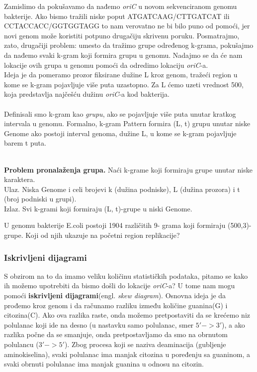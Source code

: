 Zamislimo da pokušavamo da nađemo \textit{oriC} u novom sekvenciranom genomu bakterije. Ako bismo tražili niske poput ATGATCAAG/CTTGATCAT ili CCTACCACC/GGTGGTAGG to nam verovatno ne bi bilo puno od pomoći, jer novi genom može koristiti potpuno drugačiju skrivenu poruku. Posmatrajmo, zato, drugačiji problem: umesto da tražimo grupe određenog k-grama, pokušajmo da nađemo svaki k-gram koji formira grupu u genomu. Nadajmo se da će nam lokacije ovih grupa u genomu pomoći da odredimo lokaciju \textit{oriC}-a.\\Ideja je da pomeramo prozor fiksirane dužine L kroz genom, tražeći region u kome se k-gram pojavljuje više puta uzastopno. Za L ćemo uzeti vrednost 500, koja predstavlja najčešću dužinu \textit{oriC}-a kod bakterija. \\\\
Definisali smo k-gram kao \textit{grupu}, ako se pojavljuje više puta unutar kratkog intervala u genomu. Formalno, k-gram Pattern formira (L, t) grupu unutar niske Genome ako postoji interval genoma, dužine L, u kome se k-gram pojavljuje barem t puta. \\\\
\begin{tcolorbox}
\textbf{Problem pronalaženja grupa.} Naći k-grame koji
formiraju grupe unutar niske karaktera.\\
Ulaz. Niska Genome i celi brojevi k (dužina
podniske), L (dužina prozora) i t (broj podniski u
grupi).\\
Izlaz. Svi k-grami koji formiraju (L, t)-grupe u
niski Genome.
\end{tcolorbox}

U genomu bakterije E.coli postoji 1904 različitih 9-
grama koji formiraju (500,3)-grupe. Koji od njih
ukazuje na početni region replikacije?

\subsubsection{Iskrivljeni dijagrami}

S obzirom na to da imamo veliku količinu statističkih podataka, pitamo se kako ih možemo upotrebiti da bismo došli do lokacije \textit{oriC}-a? U tome nam mogu pomoći \textbf{iskrivljeni dijagrami}(engl. \textit{skew diagram}). Osnovna ideja je da prođemo kroz genom i da računamo razliku između količine guanina(G) i citozina(C). Ako ova razlika raste, onda možemo pretpostaviti da se krećemo niz polulanac koji ide na desno (u nastavku samo polulanac, smer $5'-> 3'$), a ako razlika počne da se smanjuje, onda pretpostavljamo da smo na obrnutom polulancu ($3' -> 5'$). Zbog procesa koji se naziva deaminacija (gubljenje aminokiselina), svaki polulanac ima manjak citozina u poređenju sa guaninom, a svaki obrnuti polulanac ima manjak guanina u odnosu na citozin. 

